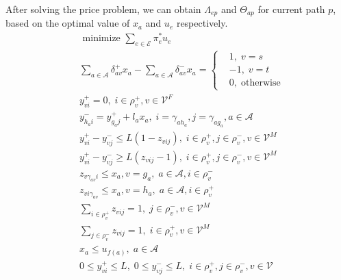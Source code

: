 \documentclass[onecolumn,11pt,draftclsnofoot]{IEEEtran}
\begin{document}
After solving the price problem, we can obtain $\Lambda_{ep}$ and $\Theta_{ap}$ for current path $p$, based on the optimal value of $x_a$ and $u_e$ respectively.
\begin{subequations}\label{model:pricing}
\begin{align}
&\mbox{ minimize  $\sum_{e \in \mathcal E} \pi^*_e u_{e}$} \label{eq:prcing-1}\\
& \mbox{$\sum_{a \in \mathcal A}\delta^{+}_{av} x_{a} - \sum_{a \in \mathcal A } \delta^{-}_{av} x_{a}$} = \left \{
\begin{aligned}
& 1, \;  v=s\\
& -1, \; v=t\\
& 0, \; \mbox{otherwise}
\end{aligned}
\right.  \label{eq:prcing-2}\\
& y^+_{vi} = 0,  \; i \in \rho^+_{v}, v \in \mathcal V^F  \label{eq:prcing-3}\\
& \mbox{$y^-_{h_ai} =  y^+_{g_aj} + l_a x_a$}, \; i = \gamma_{a h_a}, j = \gamma_{a g_a}, a \in \mathcal A  \label{eq:prcing-4}\\
& \mbox{$y^+_{vi} - y^-_{vj} \leq L (1-z_{vij})$}, \; i \in \rho^+_{v}, j \in \rho^-_{v},v \in \mathcal V^M  \label{eq:prcing-5}\\
& \mbox{$y^+_{vi} - y^-_{vj} \geq L (z_{vij}-1)$}, \; i \in \rho^+_{v}, j \in \rho^-_{v},v \in \mathcal V^M  \label{eq:prcing-6}\\
& z_{v\gamma_{av}i} \leq x_a, v = g_a, \; a \in \mathcal A, i \in \rho^-_{v} \label{eq:prcing-7}\\
& z_{vi\gamma_{av}} \leq x_a, v = h_a, \; a \in \mathcal A, i \in \rho^+_{v} \label{eq:prcing-8}\\
& \mbox{$\sum_{i \in \rho^+_{v}} z_{vij} = 1$}, \; j \in \rho^-_{v},v \in \mathcal V^M  \label{eq:prcing-9}\\
& \mbox{$\sum_{j \in \rho^-_{v}} z_{vij} = 1$}, \; i \in \rho^+_{v},v \in \mathcal V^M  \label{eq:prcing-10}\\
& x_{a} \leq u_{f(a)}, \; a \in \mathcal A \label{eq:prcing-11}\\
& 0 \leq y^+_{vi} \leq L, \; 0 \leq y^-_{vj} \leq L, \; i \in \rho^+_{v}, j \in \rho^-_{v}, v \in \mathcal V  \label{eq:prcing-12}
\end{align}
\end{subequations}
\end{document}
